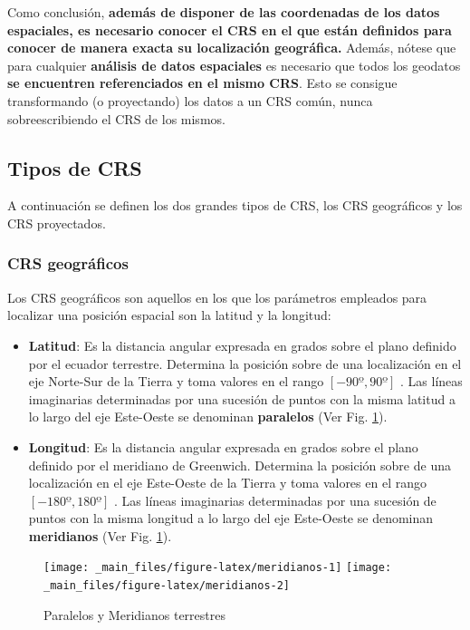 \documentclass[
]{report}
\begin{document}
Como conclusión, \textbf{además de disponer de las coordenadas de los datos
espaciales, es necesario conocer el CRS en el que están definidos para conocer
de manera exacta su localización geográfica.} Además, nótese que para cualquier
\textbf{análisis de datos espaciales} es necesario que todos los geodatos \textbf{se
encuentren referenciados en el mismo CRS}. Esto se consigue transformando (o
proyectando) los datos a un CRS común, nunca sobreescribiendo el CRS de los
mismos.

\hypertarget{tipos-de-crs}{%
\subsection{Tipos de CRS}\label{tipos-de-crs}}

A continuación se definen los dos grandes tipos de CRS, los CRS geográficos y
los CRS proyectados.

\hypertarget{crs-geogruxe1ficos}{%
\subsubsection{CRS geográficos}\label{crs-geogruxe1ficos}}

Los CRS geográficos son aquellos en los que los parámetros empleados para
localizar una posición espacial son la latitud y la longitud:

\begin{itemize}
\item
  \textbf{Latitud}: Es la distancia angular expresada en grados sobre el plano
  definido por el ecuador terrestre. Determina la posición sobre de una
  localización en el eje Norte-Sur de la Tierra y toma valores en el rango
  \([-90º,90º]\) . Las líneas imaginarias determinadas por una sucesión de
  puntos con la misma latitud a lo largo del eje Este-Oeste se denominan
  \textbf{paralelos} (Ver Fig. \ref{fig:meridianos}).
\item
  \textbf{Longitud}: Es la distancia angular expresada en grados sobre el plano
  definido por el meridiano de Greenwich. Determina la posición sobre de una
  localización en el eje Este-Oeste de la Tierra y toma valores en el rango
  \([-180º,180º]\) . Las líneas imaginarias determinadas por una sucesión de
  puntos con la misma longitud a lo largo del eje Este-Oeste se denominan
  \textbf{meridianos} (Ver Fig. \ref{fig:meridianos}).
\end{itemize}

\begin{figure}

{\centering \texttt{[image: \_main\_files/figure-latex/meridianos-1]} \texttt{[image: \_main\_files/figure-latex/meridianos-2]} 

}

\caption{Paralelos y Meridianos terrestres}\label{fig:meridianos}
\end{figure}
\end{document}
